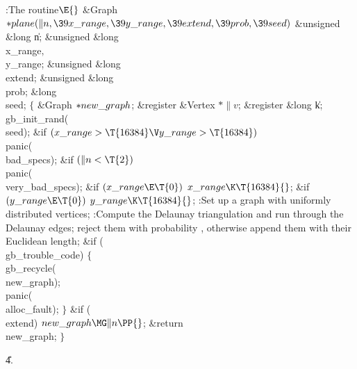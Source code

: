 \B{}:The  routine\X${}\E{}$\6
\1\1\&{Graph} ${}{*}\\{plane}(\|n,\39\\{x\_range},\39\\{y\_range},\39%
\\{extend},\39\\{prob},\39\\{seed}){}$\6
\&{unsigned} \&{long} \|n;\6
\&{unsigned} \&{long} \\{x\_range}${},{}$ \\{y\_range};\6
\&{unsigned} \&{long} \\{extend};\6
\&{unsigned} \&{long} \\{prob};\6
\&{long} \\{seed};\2\2\6
${}\{{}$\5
\1\&{Graph} ${}{*}\\{new\_graph}{}$;\6
\&{register} \&{Vertex} ${}{*}\|v{}$;\6
\&{register} \&{long} \|k;\7
\\{gb\_init\_rand}(\\{seed});\6
\&{if} ${}(\\{x\_range}>\T{16384}\V\\{y\_range}>\T{16384}){}$\1\5
\\{panic}(\\{bad\_specs});\2\6
\&{if} ${}(\|n<\T{2}){}$\1\5
\\{panic}(\\{very\_bad\_specs});\2\6
\&{if} ${}(\\{x\_range}\E\T{0}){}$\1\5
${}\\{x\_range}\K\T{16384}{}$;\2\6
\&{if} ${}(\\{y\_range}\E\T{0}){}$\1\5
${}\\{y\_range}\K\T{16384}{}$;\2\6
:Set up a graph with  uniformly distributed vertices\X;\6
:Compute the Delaunay triangulation and run through the Delaunay edges;
reject them with probability , otherwise append them
with their Euclidean length\X;\6
\&{if} (\\{gb\_trouble\_code})\5
${}\{{}$\1\6
\\{gb\_recycle}(\\{new\_graph});\6
\\{panic}(\\{alloc\_fault});\6
\4${}\}{}$\2\6
\&{if} (\\{extend})\1\5
${}\\{new\_graph}\MG\|n\PP{}$;\2\6
\&{return} \\{new\_graph};\6
\4${}\}{}$\2\par
\U4.\fi

